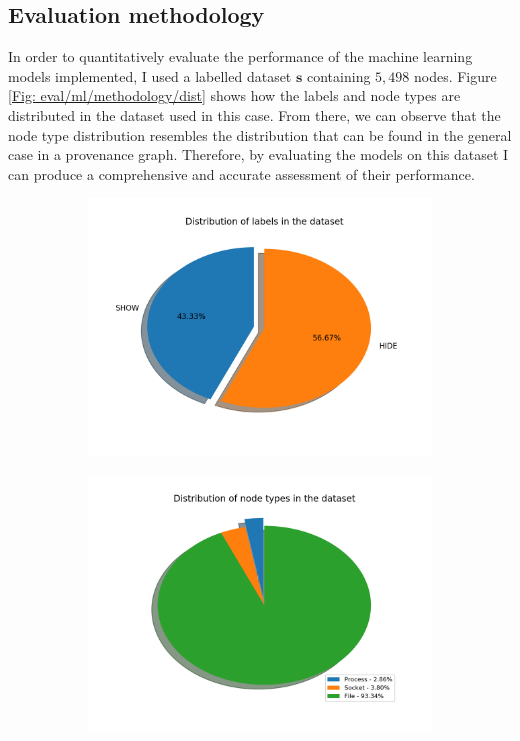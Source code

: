 	\subsection{Evaluation methodology} \label{Section: eval/ml/methodology}
		In order to quantitatively evaluate the performance of the machine learning models implemented, I used a labelled dataset $\mathbf{s}$ containing $5,498$ nodes. Figure \ref{Fig: eval/ml/methodology/dist} shows how the labels and node types are distributed in the dataset used in this case. From there, we can observe that the node type distribution resembles the distribution that can be found in the general case in a provenance graph. Therefore, by evaluating the models on this dataset I can produce a comprehensive and accurate assessment of their performance. 
		\begin{figure}[H]
			\centering
			\begin{subfigure}{.4\textwidth}
				\includegraphics[width=\textwidth]{graphics/labels-dist}
			\end{subfigure}
			\hfill
			\begin{subfigure}{.4\textwidth}
				\includegraphics[width=\textwidth]{graphics/node-dist}

\end{subfigure}
\end{figure}
